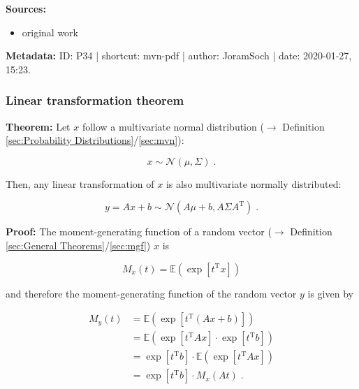 \documentclass[a4paper,12pt]{book}
\begin{document}
\vspace{1em}
\textbf{Sources:}
\begin{itemize}
\item original work\end{itemize}


\vspace{1em}
\textbf{Metadata:} ID: P34 | shortcut: mvn-pdf | author: JoramSoch | date: 2020-01-27, 15:23.


\subsubsection[\textbf{Linear transformation theorem}]{Linear transformation theorem} \label{sec:mvn-ltt}

\vspace{1em}
\textbf{Theorem:} Let $x$ follow a multivariate normal distribution ($\rightarrow$ Definition \ref{sec:Probability Distributions}/\ref{sec:mvn}):

\begin{equation} \label{eq:mvn-ltt-mvn}
x \sim \mathcal{N}(\mu, \Sigma) \; .
\end{equation}

Then, any linear transformation of $x$ is also multivariate normally distributed:

\begin{equation} \label{eq:mvn-ltt-mvn-lt}
y = Ax + b \sim \mathcal{N}(A\mu + b, A \Sigma A^\mathrm{T}) \; .
\end{equation}


\vspace{1em}
\textbf{Proof:} The moment-generating function of a random vector ($\rightarrow$ Definition \ref{sec:General Theorems}/\ref{sec:mgf}) $x$ is

\begin{equation} \label{eq:mvn-ltt-vect-mgf}
M_x(t) = \mathbb{E} \left( \exp \left[ t^\mathrm{T} x \right] \right)
\end{equation}

and therefore the moment-generating function of the random vector $y$ is given by

\begin{equation} \label{eq:mvn-ltt-y-mgf-s1}
\begin{split}
M_y(t) &= \mathbb{E} \left( \exp \left[ t^\mathrm{T} (Ax + b) \right] \right) \\
&= \mathbb{E} \left( \exp \left[ t^\mathrm{T} A x \right] \cdot \exp \left[ t^\mathrm{T} b \right] \right) \\
&= \exp \left[ t^\mathrm{T} b \right] \cdot \mathbb{E} \left( \exp \left[ t^\mathrm{T} A x \right] \right) \\
&= \exp \left[ t^\mathrm{T} b \right] \cdot M_x(At) \; .
\end{split}
\end{equation}
\end{document}
